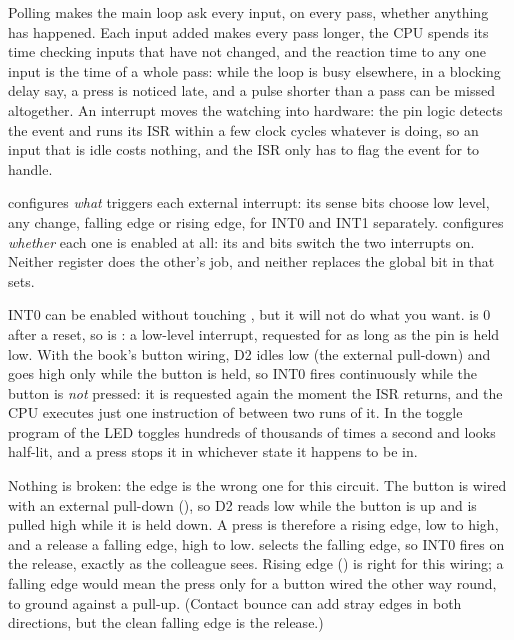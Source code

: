 
Polling makes the main loop ask every input, on every pass, whether anything has happened. Each
input added makes every pass longer, the CPU spends its time checking inputs that have not changed,
and the reaction time to any one input is the time of a whole pass: while the loop is busy
elsewhere, in a blocking delay say, a press is noticed late, and a pulse shorter than a pass can be
missed altogether. An interrupt moves the watching into hardware: the pin logic detects the event
and runs its ISR within a few clock cycles whatever  is doing, so an input that is
idle costs nothing, and the ISR only has to flag the event for  to handle.

 configures \emph{what} triggers each external interrupt: its sense bits
 choose low level, any change, falling edge or rising edge, for INT0 and INT1
separately.  configures \emph{whether} each one is enabled at all: its  and
 bits switch the two interrupts on. Neither register does the other's job, and neither
replaces the global  bit in  that  sets.

INT0 can be enabled without touching , but it will not do what you want.
 is 0 after a reset, so  is : a low-level interrupt,
requested for as long as the pin is held low. With the book's button wiring, D2 idles low (the
external pull-down) and goes high only while the button is held, so INT0 fires continuously while
the button is \emph{not} pressed: it is requested again the moment the ISR returns, and the CPU
executes just one instruction of  between two runs of it. In the toggle program of
 the LED toggles hundreds of thousands of times a second and looks half-lit, and a
press stops it in whichever state it happens to be in.

Nothing is broken: the edge is the wrong one for this circuit. The button is wired with an external
pull-down (), so D2 reads low while the button is up and is pulled high while it is
held down. A press is therefore a rising edge, low to high, and a release a falling edge, high to
low.  selects the falling edge, so INT0 fires on the release, exactly as
the colleague sees. Rising edge () is right for this wiring; a falling edge would mean the
press only for a button wired the other way round, to ground against a pull-up. (Contact bounce can
add stray edges in both directions, but the clean falling edge is the release.)

